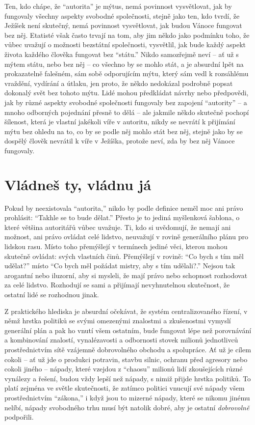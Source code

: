 \documentclass{book}
\begin{document}
Ten, kdo chápe, že \enquote{autorita} je mýtus, nemá povinnost vysvětlovat, jak by fungovaly všechny aspekty svobodné společnosti, stejně jako ten, kdo tvrdí, že Ježíšek není skutečný, nemá povinnost vysvětlovat, jak budou Vánoce fungovat bez něj. Etatisté však často trvají na tom, aby jim někdo jako podmínku toho, že vůbec uvažují o možnosti bezstátní společnosti, vysvětlil, jak bude každý aspekt života každého člověka fungovat bez \enquote{státu.} Nikdo samozřejmě neví -- ať už s mýtem státu, nebo bez něj -- co všechno by se mohlo stát, a je absurdní lpět na prokazatelně falešném, sám sobě odporujícím mýtu, který sám vedl k rozsáhlému vraždění, vydírání a útlaku, jen proto, že někdo nedokázal podrobně popsat dokonalý svět bez tohoto mýtu. Lidé mohou předkládat návrhy nebo předpovědi, jak by různé aspekty svobodné společnosti fungovaly bez zapojení \enquote{autority} -- a mnoho odborných pojednání přesně to dělá -- ale jakmile někdo skutečně pochopí šílenost, která je vlastní jakékoli víře v autoritu, nikdy se nevrátí k přijímání mýtu bez ohledu na to, co by se podle něj mohlo stát bez něj, stejně jako by se dospělý člověk nevrátil k víře v Ježíška, protože neví, zda by bez něj Vánoce fungovaly.

\section{Vládneš ty, vládnu já}

Pokud by neexistovala \enquote{autorita,} nikdo by podle definice neměl moc ani právo prohlásit: \enquote{Takhle se to bude dělat.} Přesto je to jediná myšlenková šablona, o které většina autoritářů vůbec uvažuje. Ti, kdo si uvědomují, že nemají ani možnost, ani právo ovládat celé lidstvo, neuvažují v rovině generálního plánu pro lidskou rasu. Místo toho přemýšlejí v termínech jediné věci, kterou mohou skutečně ovládat: svých vlastních činů. Přemýšlejí v rovině: \enquote{Co bych s tím měl udělat?} místo \enquote{Co bych měl požádat mistry, aby s tím udělali?.} Nejsou tak arogantní nebo iluzorní, aby si mysleli, že mají právo nebo schopnost rozhodovat za celé lidstvo. Rozhodují se sami a přijímají nevyhnutelnou skutečnost, že ostatní lidé se rozhodnou jinak.

Z praktického hlediska je absurdní očekávat, že systém centralizovaného řízení, v němž hrstka politiků se svými omezenými znalostmi a zkušenostmi vymyslí generální plán a pak ho vnutí všem ostatním, bude fungovat lépe než porovnávání a kombinování znalostí, vynalézavosti a odbornosti stovek milionů jednotlivců prostřednictvím sítě vzájemně dobrovolného obchodu a spolupráce. Ať už je cílem cokoli -- ať už jde o produkci potravin, stavbu silnic, ochranu před agresory nebo cokoli jiného -- nápady, které vzejdou z \enquote{chaosu} milionů lidí zkoušejících různé vynálezy a řešení, budou vždy lepší než nápady, s nimiž přijde hrstka politiků. To platí zejména ve světle skutečnosti, že zatímco politici vnucují své nápady všem prostřednictvím \enquote{zákona,} i když jsou to mizerné nápady, které se nikomu jinému nelíbí, nápady svobodného trhu musí být natolik dobré, aby je ostatní \emph{dobrovolně} podpořili.
\end{document}

